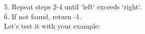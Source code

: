 \documentclass[preview]{standalone}
\begin{document}
5. Repeat steps 2-4 until `left` exceeds `right`.\\6. If not found, return -1.\\Let's test it with your example:\\
\end{document}
